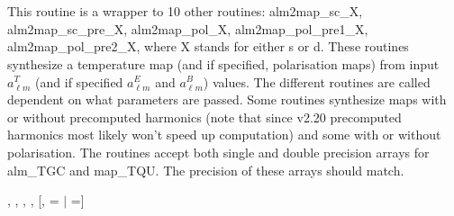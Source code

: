 
\sloppy


\section[alm2map*]{ }
\label{sub:alm2map}
\author{Eric Hivon, Frode K.~Hansen}

\begin{facility}
{This routine is a wrapper to 10 other routines: alm2map\_sc\_X,
  alm2map\_sc\_pre\_X, alm2map\_pol\_X, alm2map\_pol\_pre1\_X,
  alm2map\_pol\_pre2\_X, where X stands for either s or d. These routines
  synthesize a  temperature map (and if specified, polarisation maps) 
from input $a_{\ell m}^T$ (and if specified $a_{\ell m}^E$ and $a_{\ell m}^B$) values. 
The different routines are called dependent on what parameters are passed. 
Some routines synthesize maps with or without precomputed harmonics (note that
since \healpix v2.20 precomputed harmonics most likely won't speed up computation)
and some with or without polarisation.
The routines accept both single and double precision arrays for alm\_TGC and
  map\_TQU. The precision of these arrays should match.}
{\modAlmTools}
\end{facility}

\begin{f90format}
{%
, %
, %
, %
, %
 [, =%
$|$ =]}
\end{f90format}

